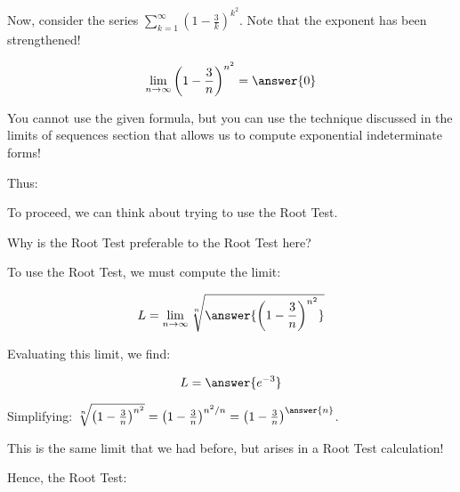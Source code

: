 \documentclass{ximera}
\begin{document}
\begin{exercise}
Now, consider the series $\sum_{k=1}^{\infty} \left(1-\frac{3}{k}\right)^{k^2}$.  Note that the exponent has been strengthened!
 
 \begin{exercise}
\[
\lim_{n \to \infty} \left(1-\frac{3}{n}\right)^{n^2} = \answer{0}
\]

\begin{hint}
You cannot use the given formula, but you can use the technique discussed in the limits of sequences section that allows us to compute exponential indeterminate forms!
\end{hint}
 
 Thus:
 \begin{multipleChoice}
\end{multipleChoice}

To proceed, we can think about trying to use the Root Test.
\begin{multipleChoice}
\end{multipleChoice}

Why is the Root Test preferable to the Root Test here?
\begin{multipleChoice}
\end{multipleChoice}

To use the Root Test, we must compute the limit:

\[
L = \lim_{n \to \infty} \sqrt[n]{\answer{ \left(1-\frac{3}{n}\right)^{n^2}}} 
\]

Evaluating this limit, we find:

\[
L = \answer{e^{-3}}
\]

\begin{hint}
Simplifying: $ \sqrt[n]{\left(1-\frac{3}{n}\right)^{n^2}} = \left(1-\frac{3}{n}\right)^{n^2/n} = \left(1-\frac{3}{n}\right)^{\answer{n}} $.  

This is the same limit that we had before, but arises in a Root Test calculation!
\end{hint}

Hence, the Root Test:
\begin{multipleChoice}
\end{multipleChoice}

\end{exercise}
\end{exercise}
\end{document}
